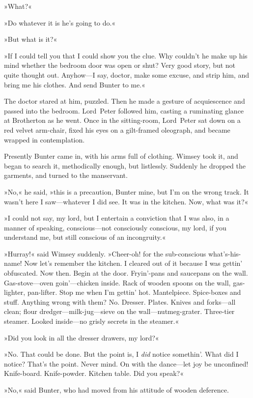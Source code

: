 »What?«

»Do whatever it is he's going to do.«

»But what is it?«

»If I could tell you that I could show you the clue. Why couldn't he make up his mind whether the bedroom door was open or shut? Very good story, but not quite thought out. Anyhow—I say, doctor, make some excuse, and strip him, and bring me his clothes. And send Bunter to me.«

The doctor stared at him, puzzled. Then he made a gesture of acquiescence and passed into the bedroom. Lord~Peter followed him, casting a ruminating glance at Brotherton as he went. Once in the sitting-room, Lord~Peter sat down on a red velvet arm-chair, fixed his eyes on a gilt-framed oleograph, and became wrapped in contemplation.

Presently Bunter came in, with his arms full of clothing. Wimsey took it, and began to search it, methodically enough, but listlessly. Suddenly he dropped the garments, and turned to the manservant.

»No,« he said, »this is a precaution, Bunter mine, but I'm on the wrong track. It wasn't here I saw—whatever I did see. It was in the kitchen. Now, what was it?«

»I could not say, my lord, but I entertain a conviction that I was also, in a manner of speaking, conscious—not consciously conscious, my lord, if you understand me, but still conscious of an incongruity.«

»Hurray!« said Wimsey suddenly. »Cheer-oh! for the sub-conscious what's-his-name! Now let's remember the kitchen. I cleared out of it because I was gettin' obfuscated. Now then. Begin at the door. Fryin'-pans and saucepans on the wall. Gas-stove—oven goin'—chicken inside. Rack of wooden spoons on the wall, gas-lighter, pan-lifter. Stop me when I'm gettin' hot. Mantelpiece. Spice-boxes and stuff. Anything wrong with them? No. Dresser. Plates. Knives and forks—all clean; flour dredger—milk-jug—sieve on the wall—nutmeg-grater. Three-tier steamer. Looked inside—no grisly secrets in the steamer.«

»Did you look in all the dresser drawers, my lord?«

»No. That could be done. But the point is, I \textit{did} notice somethin'. What did I notice? That's the point. Never mind. On with the dance—let joy be unconfined! Knife-board. Knife-powder. Kitchen table. Did you speak?«

»No,« said Bunter, who had moved from his attitude of wooden deference.

